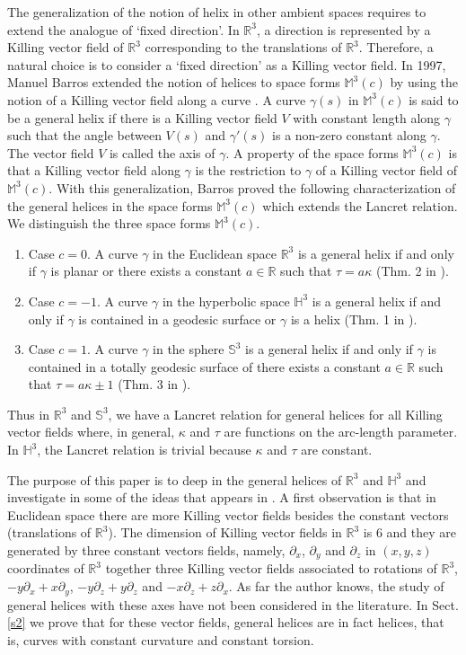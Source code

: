 \documentclass[a4paper,12pt]{amsart}
\theoremstyle{definition}
\def\r{\mathbb R}
\def\h{\mathbb H}
\def\s{\mathbb S}
\def\M{\mathbb M}
\begin{document}
The generalization of the notion of helix in other ambient spaces requires to extend the analogue of `fixed direction'. In $\r^3$, a direction is represented by a Killing vector field of $\r^3$ corresponding to the translations of $\r^3$. Therefore, a natural choice is to consider   a `fixed direction' as a Killing vector field.  In 1997, Manuel Barros extended the notion of helices to space forms $\M^3(c)$ by using the notion of a Killing vector field along a curve  \cite{ba}. A  curve $\gamma(s)$ in $\M^3(c)$ is said to be  a general helix if there is a Killing vector field $V$ with constant length  along $\gamma$ such that the angle between $V(s)$ and $\gamma'(s)$ is a non-zero constant along $\gamma$. The vector field $V$ is called the axis of $\gamma$. A property of the space forms $\M^3(c)$ is that   a Killing vector field along $\gamma$ is  the restriction to $\gamma$ of a Killing vector field of $\M^3(c)$. With this generalization, Barros proved the following characterization of the general helices in the space forms $\M^3(c)$ which extends the Lancret relation. We distinguish the three space forms $\M^3(c)$.
\begin{enumerate}
\item  Case $c=0$. A curve $\gamma$ in the Euclidean space $\r^3$ is a general helix   if and only if $\gamma$ is planar or there exists a constant $a\in\r$ such that $\tau=a\kappa$ (Thm. 2 in \cite{ba}).
\item Case $c=-1$. A curve $\gamma$ in the hyperbolic space $\h^3$ is a general helix if and only if $\gamma$ is contained in a geodesic surface or $\gamma$ is a helix (Thm. 1 in \cite{ba}).
\item Case $c=1$. A curve $\gamma$ in the sphere $\s^3$ is a general helix if and only if $\gamma$ is contained in a totally geodesic surface of there exists a constant $a\in\r$ such that $\tau=a\kappa\pm 1$ (Thm. 3 in \cite{ba}).
\end{enumerate}
Thus in $\r^3$ and $\s^3$, we have a Lancret relation for general helices for all Killing vector fields where, in general, $\kappa$ and $\tau$ are functions on the arc-length parameter. In $\h^3$, the Lancret relation is trivial because $\kappa$ and $\tau$ are constant. 


The purpose of this paper is to deep in the general helices of $\r^3$ and $\h^3$ and investigate in some of the ideas that appears  in \cite{ba}. A first observation is that in Euclidean space there are more Killing vector fields besides the constant vectors (translations of $\r^3$). The dimension of Killing vector fields in $\r^3$ is $6$ and they are generated by three constant vectors fields, namely, $\partial_x$, $\partial_y$ and $\partial_z$ in $(x,y,z)$ coordinates of $\r^3$ together three Killing vector fields associated to rotations of $\r^3$, $-y\partial_x+x\partial_y$, $-y\partial_z+y\partial_z$ and $-x\partial_z+z\partial_x$. As far the author knows, the study of general helices with these  axes have not been considered in the literature.  In Sect. \ref{s2} we prove that for these vector fields, general helices are in fact helices, that is, curves with constant curvature and constant torsion. 
\end{document}
